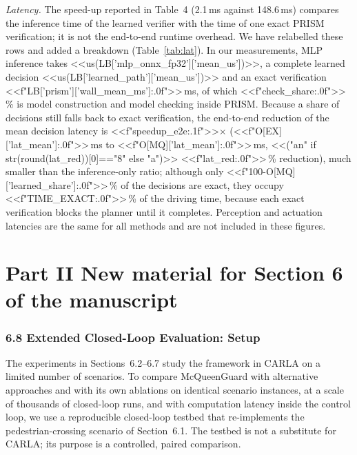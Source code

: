 \documentclass[11pt]{article}
\begin{document}
\emph{Latency.} The speed-up reported in Table~4 (2.1\,ms against 148.6\,ms) compares the inference time of the learned verifier
with the time of one exact PRISM verification; it is not the end-to-end runtime overhead. We have relabelled these rows and added a
breakdown (Table~\ref{tab:lat}). In our measurements, MLP inference takes <<us(LB['mlp_onnx_fp32']['mean_us'])>>, a complete
learned decision <<us(LB['learned_path']['mean_us'])>> and an exact verification <<f"{LB['prism']['wall_mean_ms']:.0f}">>\,ms, of which
<<f"{check_share:.0f}">>\,\% is model construction and model checking inside PRISM. Because a share of decisions still falls back to
exact verification, the end-to-end reduction of the mean decision latency is <<f"{speedup_e2e:.1f}">>$\times$
(<<f"{O[EX]['lat_mean']:.0f}">>\,ms to <<f"{O[MQ]['lat_mean']:.0f}">>\,ms, <<("an" if str(round(lat_red))[0]=="8" else "a")>> <<f"{lat_red:.0f}">>\,\% reduction), much smaller than the
inference-only ratio; although only <<f"{100-O[MQ]['learned_share']:.0f}">>\,\% of the decisions are exact, they occupy <<f"{TIME_EXACT:.0f}">>\,\% of the driving time,
because each exact verification blocks the planner until it completes. Perception and actuation latencies are the same for all methods and are not included in these figures.

\clearpage
\part*{Part II \quad New material for Section 6 of the manuscript}
\setcounter{table}{5}
\setcounter{figure}{17}

\section*{6.8 \quad Extended Closed-Loop Evaluation: Setup}
The experiments in Sections~6.2--6.7 study the framework in CARLA on a limited number of scenarios. To compare McQueenGuard with
alternative approaches and with its own ablations on identical scenario instances, at a scale of thousands of closed-loop runs, and
with computation latency inside the control loop, we use a reproducible closed-loop testbed that re-implements the
pedestrian-crossing scenario of Section~6.1. The testbed is not a substitute for CARLA; its purpose is a controlled, paired
comparison.
\end{document}
